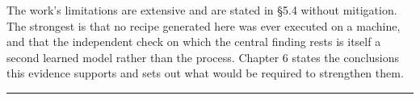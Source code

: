 The work's limitations are extensive and are stated in §5.4 without mitigation. The strongest is that no recipe generated here was ever executed on a machine, and that the independent check on which the central finding rests is itself a second learned model rather than the process. Chapter 6 states the conclusions this evidence supports and sets out what would be required to strengthen them.

\begin{center}\rule{0.5\linewidth}{0.5pt}\end{center}
